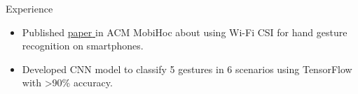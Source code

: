 \documentclass{resume} %
\begin{document}
\begin{workSection}{Experience}
    \experienceItem[
    company=Temple University,
    location=Philadelphia{,} PA,
    position=Research Intern,
    duration=June 2023 {-} July 2023
    ]
    \begin{itemize}
        \vspace{-0.5em}
        \itemsep -6pt {}
				\item Published
				\href{https://dl.acm.org/doi/10.1145/3565287.3617613}{{paper} } 
				in ACM MobiHoc about using Wi-Fi CSI for hand gesture recognition on smartphones.
        \item Developed CNN model to classify 5 gestures 
				in 6 scenarios using {TensorFlow} with {>90\% accuracy}. %
    \end{itemize}

\end{workSection}
\end{document}
